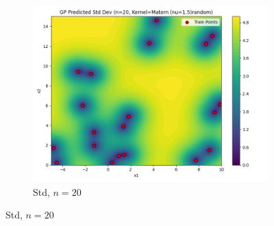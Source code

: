 \documentclass[a4paper,12pt]{article}
\begin{document}
\begin{figure}[H]
\begin{subfigure}{0.3\textwidth}
    \includegraphics[width=\linewidth]{Task-02/images/gp_std_matern_n20_random.png}
    \caption{Std, $n=20$}
\end{subfigure}


\end{figure}
\end{document}
